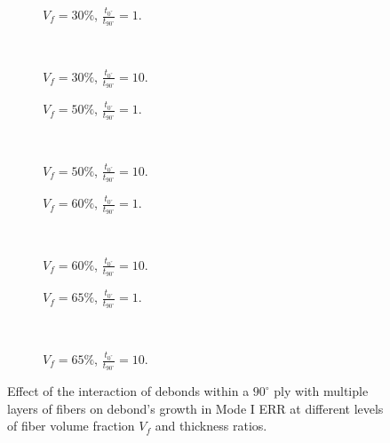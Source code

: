 \documentclass[review]{elsarticle}
\begin{document}
\begin{figure}[!h]
\centering
    \begin{subfigure}[b]{0.45\textwidth}
        \caption{$V_{f}=30\%$, $\frac{t_{0^{\circ}}}{t_{90^{\circ}}}=1$.}\label{subfig:sideabovefiber30MIthick1}
    \end{subfigure} ~
    \begin{subfigure}[b]{0.45\textwidth}
         \caption{$V_{f}=30\%$, $\frac{t_{0^{\circ}}}{t_{90^{\circ}}}=10$.}\label{subfig:sideabovefiber30MIthick10}
    \end{subfigure}

   \begin{subfigure}[b]{0.45\textwidth}
        \caption{$V_{f}=50\%$, $\frac{t_{0^{\circ}}}{t_{90^{\circ}}}=1$.}\label{subfig:sideabovefiber50MIthick1}
    \end{subfigure} ~
    \begin{subfigure}[b]{0.45\textwidth}
         \caption{$V_{f}=50\%$, $\frac{t_{0^{\circ}}}{t_{90^{\circ}}}=10$.}\label{subfig:sideabovefiber50MIthick10}
    \end{subfigure}

    \begin{subfigure}[b]{0.45\textwidth}
        \caption{$V_{f}=60\%$, $\frac{t_{0^{\circ}}}{t_{90^{\circ}}}=1$.}\label{subfig:sideabovefiber60MIthick1}
    \end{subfigure} ~
    \begin{subfigure}[b]{0.45\textwidth}
        \caption{$V_{f}=60\%$, $\frac{t_{0^{\circ}}}{t_{90^{\circ}}}=10$.}\label{subfig:sideabovefiber60MIthick10}
    \end{subfigure}

    \begin{subfigure}[b]{0.45\textwidth}
        \caption{$V_{f}=65\%$, $\frac{t_{0^{\circ}}}{t_{90^{\circ}}}=1$.}\label{subfig:sideabovefiber65MIthick1}
    \end{subfigure} ~
    \begin{subfigure}[b]{0.45\textwidth}
        \caption{$V_{f}=65\%$, $\frac{t_{0^{\circ}}}{t_{90^{\circ}}}=10$.}\label{subfig:sideabovefiber65MIthick10}
    \end{subfigure}

\caption{Effect of the interaction of debonds within a $90^{\circ}$ ply with multiple layers of fibers on debond's growth in Mode I ERR at different levels of fiber volume fraction $V_{f}$ and thickness ratios.}\label{fig:sideabovefibersMI}
\end{figure}
\end{document}
